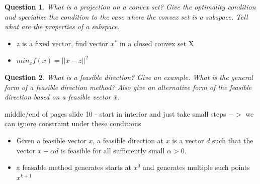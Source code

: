 \documentclass{article}
\newtheorem{question}{Question}
\begin{document}
\begin{question}
  What is a projection on a convex set? Give the optimality condition and specialize the condition
  to the case where the convex set is a subspace.  Tell what are the properties of a subspace.
\end{question}
\begin{itemize}
\item $z$ is a fixed vector, find vector $x^*$ in a closed convex set X
\item $min_x f(x) = || x - z || ^2$
\end{itemize}

\begin{question}
  What is a feasible direction? Give an example. What is the general form of a feasible direction
  method? Also give an alternative form of the feasible direction based on a feasible vector
  \(\bar{x}\).
\end{question}
middle/end of pages slide 10 - start in interior and just take small steps $->$ we can ignore
constraint under these conditions
\begin{itemize}
\item Given a feasible vector $x$, a feasible
  direction at $x$ is a vector $d$ such that the
  vector $x + \alpha d$ is feasible for all sufficiently
  small $\alpha > 0$.
\item a feasable method generates starts at $x^0$ and generates multiple such points $x^{k+1}$
\end{itemize}
\end{document}
